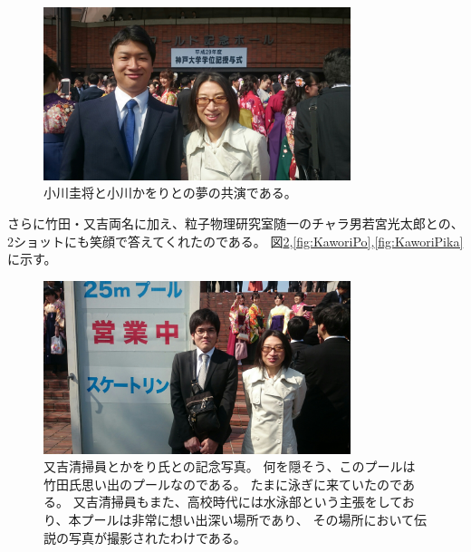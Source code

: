 \begin{figure}[H]
  \centering
  \includegraphics[width=0.8\textwidth]{./section/Kawori/figures/OgawaManKawori.jpg}
  \caption{小川圭将と小川かをりとの夢の共演である。}
\label{fig:OgawaManKawori}
\end{figure}

\par
さらに竹田・又吉両名に加え、粒子物理研究室随一のチャラ男若宮光太郎との、2ショットにも笑顔で答えてくれたのである。
図\ref{fig:KaworiMatayo},\ref{fig:KaworiPo},\ref{fig:KaworiPika}に示す。

\begin{figure}[H]
  \centering
  \includegraphics[width=0.8\textwidth]{./section/Kawori/figures/KaworiMatayo.jpg}
  \caption{又吉清掃員とかをり氏との記念写真。
  何を隠そう、このプールは竹田氏思い出のプールなのである。
  たまに泳ぎに来ていたのである。
  又吉清掃員もまた、高校時代には水泳部という主張をしており、本プールは非常に想い出深い場所であり、
  その場所において伝説の写真が撮影されたわけである。}
\label{fig:KaworiMatayo}
\end{figure}

